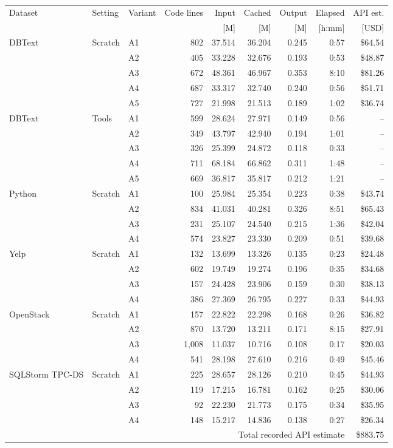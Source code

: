 \begingroup
\fontsize{8.5}{10.5}\selectfont
\setlength{\tabcolsep}{3pt}
\renewcommand{\arraystretch}{1.12}
\begin{tabular}{lllrrrrrr}
\toprule
Dataset & Setting & Variant & Code lines & Input & Cached & Output & Elapsed & API est. \\
 & & & & [M] & [M] & [M] & [h:mm] & [USD] \\
\midrule
DBText & Scratch & A1 & 802 & 37.514 & 36.204 & 0.245 & 0:57 & \$64.54 \\
 &  & A2 & 405 & 33.228 & 32.676 & 0.193 & 0:53 & \$48.87 \\
 &  & A3 & 672 & 48.361 & 46.967 & 0.353 & 8:10 & \$81.26 \\
 &  & A4 & 687 & 33.317 & 32.740 & 0.240 & 0:56 & \$51.71 \\
 &  & A5 & 727 & 21.998 & 21.513 & 0.189 & 1:02 & \$36.74 \\
\midrule
DBText & Tools & A1 & 599 & 28.624 & 27.971 & 0.149 & 0:56 & -- \\
 &  & A2 & 349 & 43.797 & 42.940 & 0.194 & 1:01 & -- \\
 &  & A3 & 326 & 25.399 & 24.872 & 0.118 & 0:33 & -- \\
 &  & A4 & 711 & 68.184 & 66.862 & 0.311 & 1:48 & -- \\
 &  & A5 & 669 & 36.817 & 35.817 & 0.212 & 1:21 & -- \\
\midrule
Python & Scratch & A1 & 100 & 25.984 & 25.354 & 0.223 & 0:38 & \$43.74 \\
 &  & A2 & 834 & 41.031 & 40.281 & 0.326 & 8:51 & \$65.43 \\
 &  & A3 & 231 & 25.107 & 24.540 & 0.215 & 1:36 & \$42.04 \\
 &  & A4 & 574 & 23.827 & 23.330 & 0.209 & 0:51 & \$39.68 \\
\midrule
Yelp & Scratch & A1 & 132 & 13.699 & 13.326 & 0.135 & 0:23 & \$24.48 \\
 &  & A2 & 602 & 19.749 & 19.274 & 0.196 & 0:35 & \$34.68 \\
 &  & A3 & 157 & 24.428 & 23.906 & 0.159 & 0:30 & \$38.13 \\
 &  & A4 & 386 & 27.369 & 26.795 & 0.227 & 0:33 & \$44.93 \\
\midrule
OpenStack & Scratch & A1 & 157 & 22.822 & 22.298 & 0.168 & 0:26 & \$36.82 \\
 &  & A2 & 870 & 13.720 & 13.211 & 0.171 & 8:15 & \$27.91 \\
 &  & A3 & 1,008 & 11.037 & 10.716 & 0.108 & 0:17 & \$20.03 \\
 &  & A4 & 541 & 28.198 & 27.610 & 0.216 & 0:49 & \$45.46 \\
\midrule
SQLStorm TPC-DS & Scratch & A1 & 225 & 28.657 & 28.126 & 0.210 & 0:45 & \$44.93 \\
 &  & A2 & 119 & 17.215 & 16.781 & 0.162 & 0:25 & \$30.06 \\
 &  & A3 & 92 & 22.230 & 21.773 & 0.175 & 0:34 & \$35.95 \\
 &  & A4 & 148 & 15.217 & 14.836 & 0.138 & 0:27 & \$26.34 \\
\midrule
\multicolumn{8}{r}{Total recorded API estimate} & \$883.75 \\
\bottomrule
\end{tabular}
\endgroup
